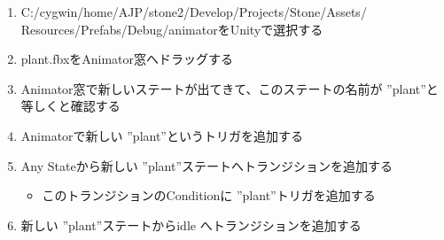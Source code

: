 \documentclass[a4paper]{report}
\newcommand{\fbxname}{{\ttfamily plant.fbx}}
\newcommand{\name}{ {\ttfamily ''plant''}}
\begin{document}
\begin{enumerate}
\begin{enumerate}
		\item {\ttfamily C:/cygwin/home/AJP/stone2/Develop/Projects/Stone/Assets/}\\{\ttfamily Resources/Prefabs/Debug/animator}をUnityで選択する
		\item \fbxname をAnimator窓へドラッグする
		\item Animator窓で新しいステートが出てきて、このステートの名前が\name と等しくと確認する
		\item Animatorで新しい\name というトリガを追加する
		\item Any Stateから新しい \name ステートへトランジションを追加する
			\begin{itemize}
				\item このトランジションのConditionに\name トリガを追加する
			\end{itemize}
		\item 新しい \name ステートからidle へトランジションを追加する
	\end{enumerate}
\end{enumerate}
\end{document}
